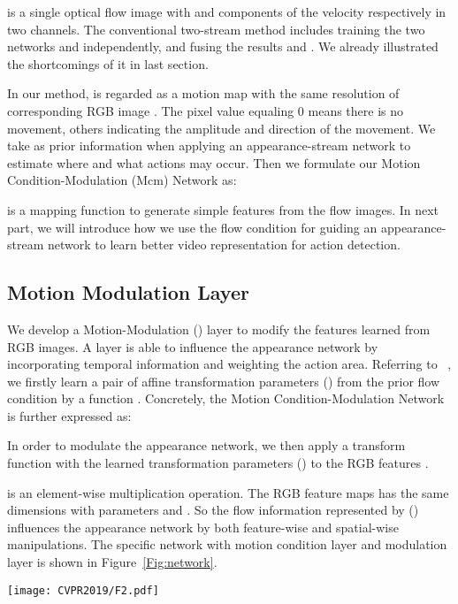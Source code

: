 \documentclass[10pt,twocolumn,letterpaper]{article}
\begin{document}
 is a single optical flow image with  and  components of the velocity respectively in two channels. The conventional two-stream method includes training the two networks  and  independently, and fusing the results  and  . We already illustrated the shortcomings of it in last section. 

In our method,  is regarded as a motion map with the same resolution of corresponding RGB image . The pixel value equaling 0 means there is no movement, others indicating the amplitude and direction of the movement. We take  as prior information  when applying an appearance-stream network  to estimate where and what actions may occur. Then we formulate our Motion Condition-Modulation (Mcm) Network as:


 is a mapping function to generate simple features from the flow images. In next part, we will introduce how we use the flow condition for guiding an appearance-stream network to learn better video representation for action detection.

\subsection{Motion Modulation Layer}
We develop a Motion-Modulation () layer to modify the features learned from RGB images. A  layer is able to influence the appearance network by incorporating temporal information and weighting the action area. Referring to ~\cite{Wang2018}, we firstly learn a pair of affine transformation parameters () from the prior flow condition  by a function  . Concretely, the Motion Condition-Modulation Network is further expressed as:

In order to modulate the appearance network, we then apply a transform function   with the learned transformation parameters () to the RGB features .

 is an element-wise multiplication operation. The RGB feature maps  has the same dimensions with parameters  and . So the flow information represented by () influences the appearance network by both feature-wise and spatial-wise manipulations. The specific network with motion condition layer and modulation layer is shown in Figure~\ref{Fig:network}.

\begin{figure*}[ht]
\centering
\texttt{[image: CVPR2019/F2.pdf]}
\caption{The structure of Motion Condition-Modulation Network based on SSD (Mcm-SSD). Motion Condition Layer maps flow images to prior condition information. The condition inputs to Motion Modulation Layer for generating transformation parameters which are used to modulate RGB features. Motion Modulation Layer is able to applied to any low-level convolutional features. }
\label{Fig:network}
\end{figure*}
\end{document}
